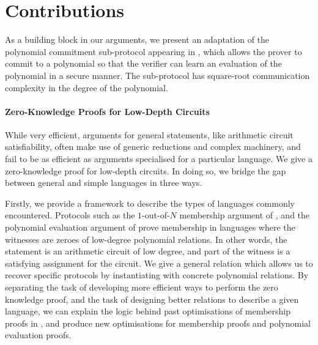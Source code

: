 \section{Contributions}

As a building block in our arguments, we present an adaptation of the polynomial commitment sub-protocol appearing in \cite{BootleG18}, which allows the prover to commit to a polynomial so that the verifier can learn an evaluation of the polynomial in a secure manner. The sub-protocol has square-root communication complexity in the degree of the polynomial.

\paragraph{Zero-Knowledge Proofs for Low-Depth Circuits} While very efficient, arguments for general statements, like arithmetic circuit satisfiability, often make use of generic reductions and complex machinery, and fail to be as efficient as arguments specialised for a particular language. We give a zero-knowledge proof for low-depth circuits. In doing so, we bridge the gap between general and simple languages in three ways.

Firstly, we provide a framework to describe the types of languages commonly encountered. Protocols such as the $1$-out-of-$N$ membership argument of  \cite{GrothK15}, and the polynomial evaluation argument of \cite{BayerG13} prove membership in languages where the witnesses are zeroes of low-degree polynomial relations. In other words, the statement is an arithmetic circuit of low degree, and part of the witness is a satisfying assignment for the circuit. We give a general relation which allows us to recover specific protocols by instantiating with concrete polynomial relations. By separating the task of developing more efficient ways to perform the zero knowledge proof, and the task of designing better relations to describe a given language, we can explain the logic behind past optimisations of membership proofs in \cite{GrothK15,BootleG18}, and produce new optimisations for membership proofs and polynomial evaluation proofs.

